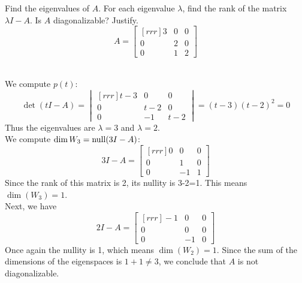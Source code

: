 \bb[itemsep=5pt, topsep=5pt]

\ii Find the eigenvalues of $A$. For each eigenvalue $\lambda$, find the rank of the matrix $\lambda I - A$. Is $A$ diagonalizable? Justify.
\[
A=
\begin{bmatrix}[rrr]
3&0&0\\
0&2&0\\
0&1&2
\end{bmatrix}
\]
\\
\begin{solution}
\noindent We compute $p(t)$: 
$$
\det(t I - A) =
\begin{vmatrix}[rrr]
t - 3&0&0\\
0&t - 2&0\\
0&-1&t - 2
\end{vmatrix}
= (t - 3)(t - 2)^2 = 0
$$
Thus the eigenvalues are $\lambda =3$ and $\lambda = 2$.
\\
We compute $\dim W_3=\operatorname{null}(3I-A)$: 
\[
3I-A=
\begin{bmatrix}[rrr]
0&0&0\\
0&1&0\\
0&-1&1
\end{bmatrix}
\]
Since the rank of this matrix is 2, its nullity is 3-2=1. This means $\dim(W_{3})=1$. 
\\
Next, we have 
$$2I-A=
\begin{bmatrix}[rrr]
-1&0&0\\
0&0&0\\
0&-1&0
\end{bmatrix}
$$
Once again the nullity is 1, which means $\dim(W_2)=1$. Since the sum of the dimensions of the eigenspaces is $1+1\ne 3$, we conclude that $A$ is not diagonalizable. 
\end{solution}

